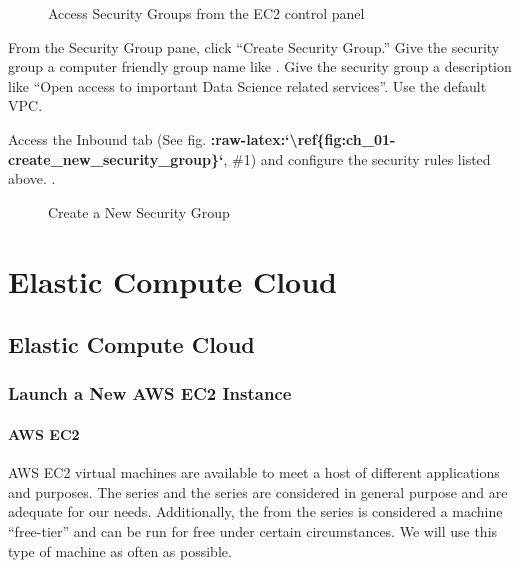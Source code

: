 \documentclass[letterpaper,10pt,english]{sphinxmanual}
\begin{document}
\begin{figure}[htbp]
\centering
\capstart

\noindent{}
\caption{Access Security Groups from the EC2 control panel}\label{\detokenize{01-amazon-web-services:id35}}\end{figure}

From the Security Group pane, click “Create Security Group.” Give the
security group a computer friendly group name like .
Give the security group a description like “Open access to important
Data Science related services”. Use the default VPC.

Access the Inbound tab (See fig.
{\color{red}\bfseries{}:raw-latex:{}`\textbackslash{}ref\{fig:ch\_01-create\_new\_security\_group\}{}`}, \#1) and
configure the security rules listed above. .

\begin{figure}[htbp]
\centering
\capstart

\noindent{}
\caption{Create a New Security Group}\label{\detokenize{01-amazon-web-services:id36}}\end{figure}


\chapter{Elastic Compute Cloud}
\label{\detokenize{index:elastic-compute-cloud}}

\section{Elastic Compute Cloud}
\label{\detokenize{02-elastic-compute-cloud:Elastic-Compute-Cloud}}\label{\detokenize{02-elastic-compute-cloud::doc}}

\subsection{Launch a New AWS EC2 Instance}
\label{\detokenize{02-elastic-compute-cloud:Launch-a-New-AWS-EC2-Instance}}

\subsubsection{AWS EC2 }
\label{\detokenize{02-elastic-compute-cloud:AWS-EC2-t2.micro}}
AWS EC2 virtual machines are available to meet a host of different
applications and purposes. The  series and the  series are
considered in general purpose and are adequate for our needs.
Additionally, the  from the  series is considered a
machine “free-tier” and can be run for free under certain circumstances.
We will use this type of machine as often as possible.
\end{document}
